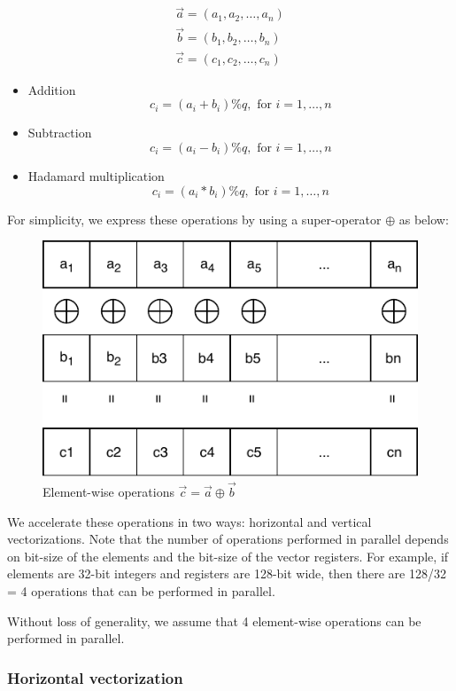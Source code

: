 \documentclass[oneside,9pt]{article}
\begin{document}
\begin{equation}
\begin{split}
\vec{a} = (a_1, a_2, \dots, a_n) \\
\vec{b} = (b_1, b_2, \dots, b_n) \\
\vec{c} = (c_1, c_2, \dots, c_n)
\end{split}
\end{equation}

\begin{itemize}
\item Addition
$$
c_i = (a_i + b_i) \% q, \text{ for } i = 1, \dots, n
$$
\item Subtraction
$$
c_i = (a_i - b_i) \% q, \text{ for } i = 1, \dots, n
$$

\item Hadamard multiplication
$$
c_i = (a_i * b_i) \% q, \text{ for } i = 1, \dots, n
$$

\end{itemize}

For simplicity, we express these operations by using a super-operator $\oplus$ as below:

\begin{figure}[H]
\centering
\includegraphics[width=0.5\columnwidth]{operator.pdf}
\caption{Element-wise operations $\vec{c} = \vec{a} \oplus \vec{b}$}
\label{fig:operator}
\end{figure}

We accelerate these operations in two ways: horizontal and vertical vectorizations. Note that the number of operations performed in parallel depends on bit-size of the elements and the bit-size of the vector registers. For example, if elements are 32-bit integers and registers are 128-bit wide, then there are 128/32 = 4 operations that can be performed in parallel.

Without loss of generality, we assume that 4 element-wise operations can be performed in parallel.

\subsubsection{Horizontal vectorization}
\end{document}
